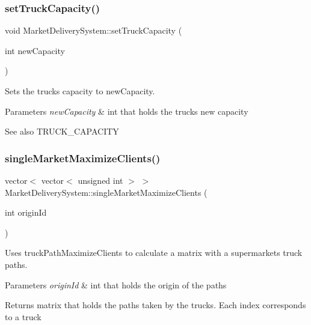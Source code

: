 \subsubsection{\texorpdfstring{set\+Truck\+Capacity()}{setTruckCapacity()}}
{\footnotesize\ttfamily void Market\+Delivery\+System\+::set\+Truck\+Capacity (\begin{DoxyParamCaption}\item[{int}]{new\+Capacity }\end{DoxyParamCaption})}



Sets the trucks\textquotesingle{} capacity to new\+Capacity. 


\begin{DoxyParams}{Parameters}
{\em new\+Capacity} & int that holds the trucks\textquotesingle{} new capacity \\
\hline
\end{DoxyParams}
\begin{DoxySeeAlso}{See also}
T\+R\+U\+C\+K\+\_\+\+C\+A\+P\+A\+C\+I\+TY 
\end{DoxySeeAlso}
\hypertarget{class_market_delivery_system_a982fd9065bf4ae600b1e430f7288fa5b}{}\label{class_market_delivery_system_a982fd9065bf4ae600b1e430f7288fa5b} 
\subsubsection{\texorpdfstring{single\+Market\+Maximize\+Clients()}{singleMarketMaximizeClients()}}
{\footnotesize\ttfamily vector$<$ vector$<$ unsigned int $>$ $>$ Market\+Delivery\+System\+::single\+Market\+Maximize\+Clients (\begin{DoxyParamCaption}\item[{int}]{origin\+Id }\end{DoxyParamCaption})}



Uses truck\+Path\+Maximize\+Clients to calculate a matrix with a supermarket\textquotesingle{}s truck paths. 


\begin{DoxyParams}{Parameters}
{\em origin\+Id} & int that holds the origin of the paths \\
\hline
\end{DoxyParams}
\begin{DoxyReturn}{Returns}
matrix that holds the paths taken by the trucks. Each index corresponds to a truck 
\end{DoxyReturn}
\hypertarget{class_market_delivery_system_a6ed74e3fcb2365305853e3b937bfae7f}{}\label{class_market_delivery_system_a6ed74e3fcb2365305853e3b937bfae7f} 
